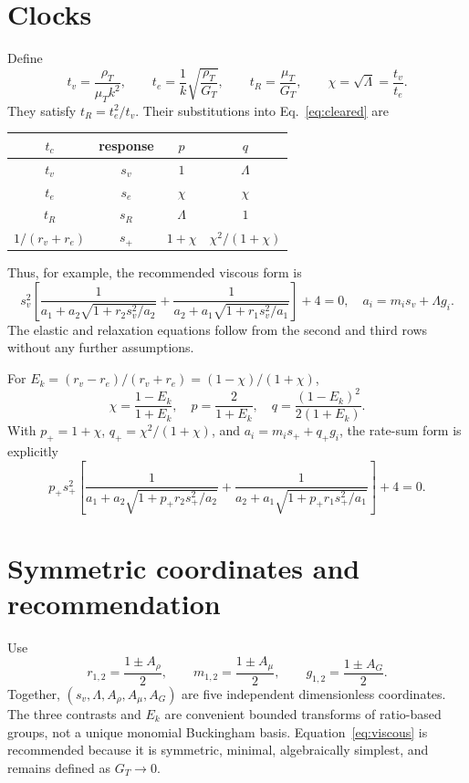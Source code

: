 \documentclass[11pt]{article}
\begin{document}
\section{Clocks}
Define
\[
t_v=\frac{\rho_T}{\mu_Tk^2},\qquad
t_e=\frac1k\sqrt{\frac{\rho_T}{G_T}},\qquad
t_R=\frac{\mu_T}{G_T},\qquad
\chi=\sqrt\Lambda=\frac{t_v}{t_e}.
\]
They satisfy $t_R=t_e^2/t_v$. Their substitutions into
Eq.~\eqref{eq:cleared} are
\begin{center}
\begin{tabular}{cccc}
\toprule
$t_c$ & response & $p$ & $q$\\
\midrule
$t_v$ & $s_v$ & $1$ & $\Lambda$\\
$t_e$ & $s_e$ & $\chi$ & $\chi$\\
$t_R$ & $s_R$ & $\Lambda$ & $1$\\
$1/(r_v+r_e)$ & $s_+$ & $1+\chi$ & $\chi^2/(1+\chi)$\\
\bottomrule
\end{tabular}
\end{center}
Thus, for example, the recommended viscous form is
\begin{equation}
s_v^2\left[
\frac1{a_1+a_2\sqrt{1+r_2s_v^2/a_2}}+
\frac1{a_2+a_1\sqrt{1+r_1s_v^2/a_1}}
\right]+4=0,
\quad a_i=m_is_v+\Lambda g_i.\label{eq:viscous}
\end{equation}
The elastic and relaxation equations follow from the second and third rows
without any further assumptions.

For $E_k=(r_v-r_e)/(r_v+r_e)=(1-\chi)/(1+\chi)$,
\[
\chi=\frac{1-E_k}{1+E_k},\quad
p=\frac2{1+E_k},\quad q=\frac{(1-E_k)^2}{2(1+E_k)}.
\]
With $p_+=1+\chi$, $q_+=\chi^2/(1+\chi)$, and
$a_i=m_is_++q_+g_i$, the rate-sum form is explicitly
\[
p_+s_+^2\left[
\frac1{a_1+a_2\sqrt{1+p_+r_2s_+^2/a_2}}+
\frac1{a_2+a_1\sqrt{1+p_+r_1s_+^2/a_1}}
\right]+4=0.
\]

\section{Symmetric coordinates and recommendation}
Use
\[
r_{1,2}=\frac{1\pm A_\rho}{2},\qquad
m_{1,2}=\frac{1\pm A_\mu}{2},\qquad
g_{1,2}=\frac{1\pm A_G}{2}.
\]
Together, $(s_v,\Lambda,A_\rho,A_\mu,A_G)$ are five independent
dimensionless coordinates. The three contrasts and $E_k$ are convenient
bounded transforms of ratio-based groups, not a unique monomial Buckingham
basis. Equation~\eqref{eq:viscous} is recommended because it is symmetric,
minimal, algebraically simplest, and remains defined as $G_T\to0$.
\end{document}
